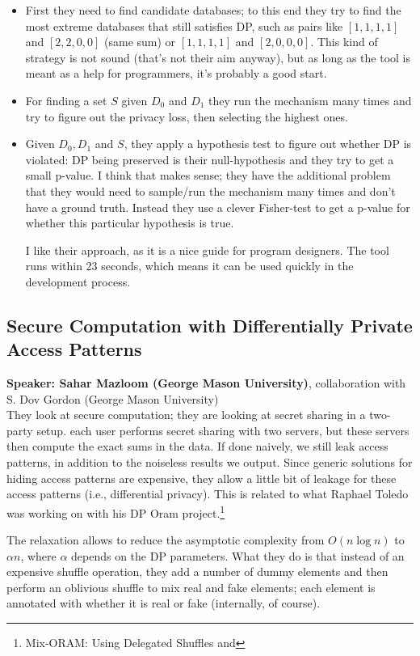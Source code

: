 \documentclass{article}
\begin{document}
\begin{itemize}
	\item First they need to find candidate databases; to this end they try to find the most extreme databases that still satisfies DP, such as pairs like $[1,1,1,1]$ and $[2,2,0,0]$ (same sum) or $[1,1,1,1]$ and $[2,0,0,0]$. This kind of strategy is not sound (that's not their aim anyway), but as long as the tool is meant as a help for programmers, it's probably a good start.
	\item For finding a set $S$ given $D_0$ and $D_1$ they run the mechanism many times and try to figure out the privacy loss, then selecting the highest ones.
	\item Given $D_0, D_1$ and $S$, they apply a hypothesis test to figure out whether DP is violated: DP being preserved is their null-hypothesis and they try to get a small p-value. I think that makes sense; they have the additional problem that they would need to sample/run the mechanism many times and don't have a ground truth. Instead they use a clever Fisher-test to get a p-value for whether this particular hypothesis is true.

I like their approach, as it is a nice guide for program designers. The tool runs within 23 seconds, which means it can be used quickly in the development process.

\end{itemize}


\subsection{Secure Computation with Differentially Private Access Patterns}
\noindent\textbf{Speaker: Sahar Mazloom (George Mason University)}, collaboration with S. Dov Gordon (George Mason University)\\

They look at secure computation; they are looking at secret sharing in a two-party setup. each user performs secret sharing with two servers, but these servers then compute the exact sums in the data. If done naively, we still leak access patterns, in addition to the noiseless results we output. Since generic solutions for hiding access patterns are expensive, they allow a little bit of leakage for these access patterns (i.e., differential privacy). This is related to what Raphael Toledo was working on with his DP Oram project.\footnote{Mix-ORAM: Using Delegated Shuffles and }

The relaxation allows to reduce the asymptotic complexity from $O(n\log n)$ to $\alpha n$, where $\alpha$ depends on the DP parameters.  What they do is that instead of an expensive shuffle operation, they add a number of dummy elements and then perform an oblivious shuffle to mix real and fake elements; each element is annotated with whether it is real or fake (internally, of course).
\end{document}
